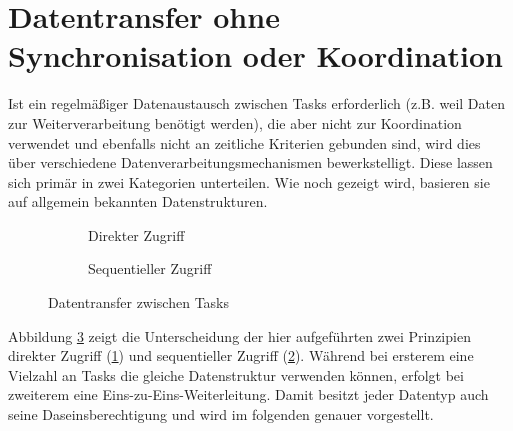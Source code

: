 \documentclass{llncs}
\begin{document}
\section{Datentransfer ohne Synchronisation oder Koordination}
\label{sub:Datentransfer_ohne_Sync_Koord}
Ist ein regelmäßiger Datenaustausch zwischen Tasks erforderlich (z.B. weil Daten zur Weiterverarbeitung benötigt werden), die aber nicht zur Koordination verwendet und ebenfalls nicht an zeitliche Kriterien gebunden sind, wird dies über verschiedene Datenverarbeitungsmechanismen bewerkstelligt. Diese lassen sich primär in zwei Kategorien unterteilen. Wie noch gezeigt wird, basieren sie auf allgemein bekannten Datenstrukturen.
\begin{figure}
	\centering
	\begin{subfigure}[b]{.450\textwidth}
		\def\svgwidth{\columnwidth}
		
		\caption{\label{subfig:zufaelliger_Zugriff}Direkter Zugriff}
	\end{subfigure}
	\hspace{3em}
	\begin{subfigure}[b]{.450\textwidth}
		\def\svgwidth{\columnwidth}
		
		\caption{\label{subfig:sequentiell_Zugriff}Sequentieller Zugriff}
	\end{subfigure}
	\caption{\label{fig:Datentransfer_Ueberblick}Datentransfer zwischen Tasks \autocite[vgl.][95]{Cooling2017}}
\end{figure}

Abbildung \ref{fig:Datentransfer_Ueberblick} zeigt die Unterscheidung der hier aufgeführten zwei Prinzipien \glqq direkter Zugriff\grqq{}  (\ref{subfig:zufaelliger_Zugriff}) und \glqq sequentieller Zugriff\grqq{} (\ref{subfig:sequentiell_Zugriff}). Während bei ersterem eine Vielzahl an Tasks die gleiche Datenstruktur verwenden können, erfolgt bei zweiterem eine Eins-zu-Eins-Weiterleitung. Damit besitzt jeder Datentyp auch seine Daseinsberechtigung und wird im folgenden genauer vorgestellt.
\end{document}
